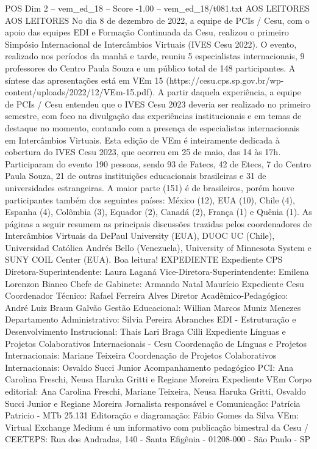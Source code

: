 \begin{textsample}{POS Dim 2 – vem\_ed\_18 – Score -1.00 – vem\_ed\_18/t081.txt}  \label{ex:f2_pos_047}
AOS LEITORES AOS LEITORES No dia 8 de dezembro de 2022, a equipe de PCIs / Cesu, com o apoio das equipes EDI e Formação Continuada da Cesu, realizou o primeiro Simpósio Internacional de Intercâmbios Virtuais (IVES Cesu 2022).
O evento, realizado nos períodos da manhã e tarde, reuniu 5 especialistas internacionais, 9 professores do Centro Paula Souza e um público total de 148 participantes.
A síntese das apresentações está em VEm 15 (https://cesu.cps.sp.gov.br/wp-content/uploads/2022/12/VEm-15.pdf).
A partir daquela experiência, a equipe de PCIs / Cesu entendeu que o IVES Cesu 2023 deveria ser realizado no primeiro semestre, com foco na divulgação das experiências institucionais e em temas de destaque no momento, contando com a presença de especialistas internacionais em Intercâmbios Virtuais.
Esta edição de VEm é inteiramente dedicada à cobertura do IVES Cesu 2023, que ocorreu em 25 de maio, das 14 às 17h.
Participaram do evento 190 pessoas, sendo 93 de Fatecs, 42 de Etecs, 7 do Centro Paula Souza, 21 de outras instituições educacionais brasileiras e 31 de universidades estrangeiras.
A maior parte (151) é de brasileiros, porém houve participantes também dos seguintes países: México (12), EUA (10), Chile (4), Espanha (4), Colômbia (3), Equador (2), Canadá (2), França (1) e Quênia (1).
As páginas a seguir resumem as principais discussões trazidas pelos coordenadores de Intercâmbios Virtuais da DePaul University (EUA), DUOC UC (Chile), Universidad Católica Andrés Bello (Venezuela), University of Minnesota System e SUNY COIL Center (EUA).
Boa leitura!
EXPEDIENTE Expediente CPS Diretora-Superintendente: Laura Laganá Vice-Diretora-Superintendente: Emilena Lorenzon Bianco Chefe de Gabinete: Armando Natal Maurício Expediente Cesu Coordenador Técnico: Rafael Ferreira Alves Diretor Acadêmico-Pedagógico: André Luiz Braun Galvão Gestão Educacional: Willian Marcos Muniz Menezes Departamento Administrativo: Silvia Pereira Abranches EDI - Estruturação e Desenvolvimento Instrucional: Thais Lari Braga Cilli Expediente Línguas e Projetos Colaborativos Internacionais - Cesu Coordenação de Línguas e Projetos Internacionais: Mariane Teixeira Coordenação de Projetos Colaborativos Internacionais: Osvaldo Succi Junior Acompanhamento pedagógico PCI: Ana Carolina Freschi, Neusa Haruka Gritti e Regiane Moreira Expediente VEm Corpo editorial: Ana Carolina Freschi, Mariane Teixeira, Neusa Haruka Gritti, Osvaldo Succi Junior e Regiane Moreira Jornalista responsável e Comunicação: Patrícia Patricio - MTb 25.131 Editoração e diagramação: Fábio Gomes da Silva VEm: Virtual Exchange Medium é um informativo com publicação bimestral da Cesu / CEETEPS: Rua dos Andradas, 140 - Santa Efigênia - 01208-000 - São Paulo - SP

\end{textsample}
